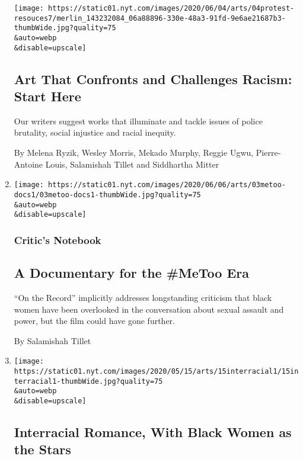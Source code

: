 \begin{enumerate}
  \texttt{[image: https://static01.nyt.com/images/2020/06/04/arts/04protest-resouces7/merlin\_143232084\_06a88896-330e-48a3-91fd-9e6ae21687b3-thumbWide.jpg?quality=75\\\&auto=webp\\\&disable=upscale]}

  \hypertarget{art-that-confronts-and-challenges-racism-start-here}{%
  \subsection{Art That Confronts and Challenges Racism: Start
  Here}\label{art-that-confronts-and-challenges-racism-start-here}}

  Our writers suggest works that illuminate and tackle issues of police
  brutality, social injustice and racial inequity.

  By Melena Ryzik, Wesley Morris, Mekado Murphy, Reggie Ugwu,
  Pierre-Antoine Louis, Salamishah Tillet and Siddhartha Mitter
\item
  \href{/2020/06/03/movies/metoo-documentary-russell-simmons.html}{}

  \texttt{[image: https://static01.nyt.com/images/2020/06/06/arts/03metoo-docs1/03metoo-docs1-thumbWide.jpg?quality=75\\\&auto=webp\\\&disable=upscale]}

  \hypertarget{critics-notebook}{%
  \subsubsection{Critic's Notebook}\label{critics-notebook}}

  \hypertarget{a-documentary-for-the-metoo-era}{%
  \subsection{A Documentary for the \#MeToo
  Era}\label{a-documentary-for-the-metoo-era}}

  ``On the Record'' implicitly addresses longstanding criticism that
  black women have been overlooked in the conversation about sexual
  assault and power, but the film could have gone further.

  By Salamishah Tillet
\item
  \href{/2020/05/22/arts/television/insecure-lovebirds-interracial.html}{}

  \texttt{[image: https://static01.nyt.com/images/2020/05/15/arts/15interracial1/15interracial1-thumbWide.jpg?quality=75\\\&auto=webp\\\&disable=upscale]}

  \hypertarget{interracial-romance-with-black-women-as-the-stars}{%
  \subsection{Interracial Romance, With Black Women as the
  Stars}\label{interracial-romance-with-black-women-as-the-stars}}


\end{enumerate}
